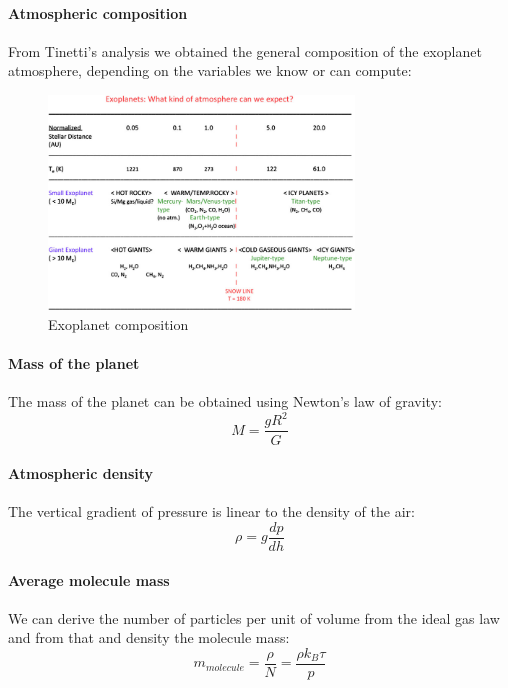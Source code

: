 \documentclass{cfp}
\begin{document}
\paragraph{Atmospheric composition} \label{basic}
From Tinetti's analysis \cite{Tinetti} we obtained the general composition of the exoplanet atmosphere, depending on the variables we know or can compute:
\begin{figure}[!h]
\centering
\caption{Exoplanet composition}
\includegraphics[width=230pt]{A-simple-classification-for-the-atmospheric-composition-of-exoplanets-based-on-their.jpg}
\end{figure}
\paragraph{Mass of the planet} The mass of the planet can be obtained using Newton's law of gravity:\\
\begin{equation}
    M = \frac{g R^2}{G}
\end{equation}
\paragraph{Atmospheric density} The vertical gradient of pressure is linear to the density of the air:\\
\begin{equation}
    \rho = g \frac{dp}{dh}
\end{equation}
\paragraph{Average molecule mass} We can derive the number of particles per unit of volume from the ideal gas law and from that and density the molecule mass:\\
\begin{equation}
m_{molecule} = \frac{\rho}{N} = \frac{\rho k_B \tau}{p}
\end{equation}
\end{document}
